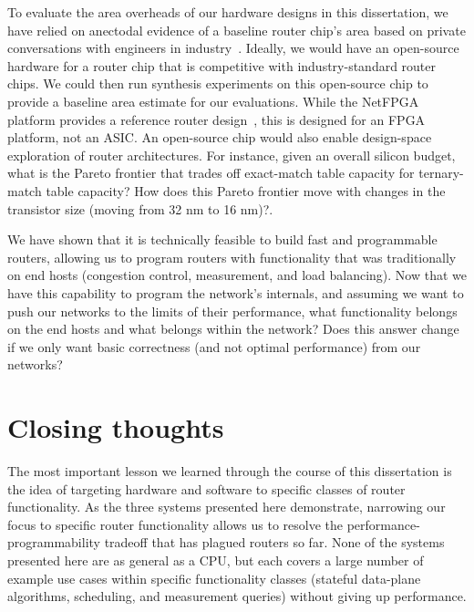  To evaluate the area
overheads of our hardware designs in this dissertation, we have relied on
anectodal evidence of a baseline router chip's area based on private conversations with
engineers in industry~\cite{gibb_parsing}. Ideally, we would have an
open-source hardware for a router chip that is competitive with
industry-standard router chips. We could then run synthesis experiments
on this open-source chip to provide a baseline area estimate for our evaluations. While the NetFPGA
platform provides a reference router design~\cite{netfpga}, this is designed
for an FPGA platform, not an ASIC. An open-source chip would also enable design-space
exploration of router architectures. For instance, given an overall silicon
budget, what is the Pareto frontier that trades off exact-match table capacity
for ternary-match table capacity? How does this Pareto frontier move with
changes in the transistor size (\eg moving from 32 nm to 16 nm)?.

 We have shown
that it is technically feasible to build fast and programmable routers,
allowing us to program routers with functionality that was traditionally on end
hosts (\eg congestion control, measurement, and load balancing). Now
that we have this capability to program the network's internals, and assuming
we want to push our networks to the limits of their performance, what
functionality belongs on the end hosts and what belongs within
the network?  Does this answer change if we only want basic correctness (and
not optimal performance) from our networks?

\section{Closing thoughts}
The most important lesson we learned through the course of this dissertation is
the idea of targeting hardware and software to specific classes of router
functionality. As the three systems presented here demonstrate, narrowing our
focus to specific router functionality allows us to resolve the
performance-programmability tradeoff that has plagued routers so far. None of
the systems presented here are as general as a CPU, but each covers a large
number of example use cases within specific functionality classes (stateful
data-plane algorithms, scheduling, and measurement queries) without giving up performance.

